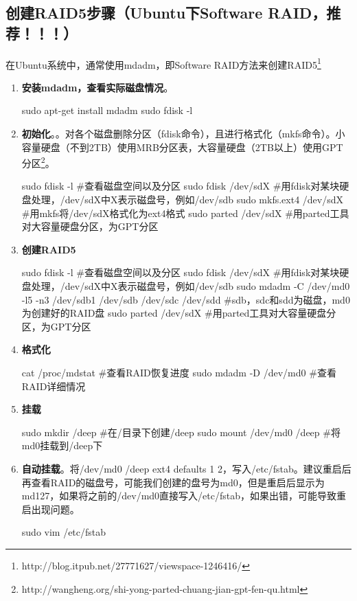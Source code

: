 \subsection{创建RAID5步骤（Ubuntu下Software RAID，推荐！！！）}
在Ubuntu系统中，通常使用mdadm，即Software RAID方法来创建RAID5\footnote{http://blog.itpub.net/27771627/viewspace-1246416/}
\begin{enumerate}
\item \textbf{安装mdadm，查看实际磁盘情况}。
\begin{bash}
sudo apt-get install mdadm
sudo fdisk -l
\end{bash}
\item \textbf{初始化}。。对各个磁盘删除分区（fdisk命令），且进行格式化（mkfs命令）。小容量硬盘（不到2TB）使用MRB分区表，大容量硬盘（2TB以上）使用GPT分区\footnote{http://wangheng.org/shi-yong-parted-chuang-jian-gpt-fen-qu.html}。
\begin{bash}
sudo fdisk -l		   #查看磁盘空间以及分区
sudo fdisk /dev/sdX  #用fdisk对某块硬盘处理，/dev/sdX中X表示磁盘号，例如/dev/sdb
sudo mkfs.ext4 /dev/sdX    #用mkfs将/dev/sdX格式化为ext4格式
sudo parted /dev/sdX	#用parted工具对大容量硬盘分区，为GPT分区
\end{bash}
\item \textbf{创建RAID5}
\begin{bash}
sudo fdisk -l		   #查看磁盘空间以及分区
sudo fdisk /dev/sdX  #用fdisk对某块硬盘处理，/dev/sdX中X表示磁盘号，例如/dev/sdb
sudo mdadm -C /dev/md0 -l5 -n3 /dev/sdb1 /dev/sdb /dev/sdc /dev/sdd   #sdb，sdc和sdd为磁盘，md0为创建好的RAID盘
sudo parted /dev/sdX	#用parted工具对大容量硬盘分区，为GPT分区
\end{bash}
\item \textbf{格式化}
\begin{bash}
cat /proc/mdstat	#查看RAID恢复进度
sudo mdadm -D /dev/md0  #查看RAID详细情况
\end{bash} 
\item \textbf{挂载}
\begin{bash}
sudo mkdir /deep		#在/目录下创建/deep
sudo mount /dev/md0 /deep  	#将md0挂载到/deep下
\end{bash} 
\item \textbf{自动挂载}。将/dev/md0 /deep ext4 defaults 1 2，写入/etc/fstab。建议重启后再查看RAID的磁盘号，可能我们创建的盘号为md0，但是重启后显示为md127，如果将之前的/dev/md0直接写入/etc/fstab，如果出错，可能导致重启出现问题。
\begin{bash}
sudo vim /etc/fstab 
\end{bash}
\end{enumerate}


